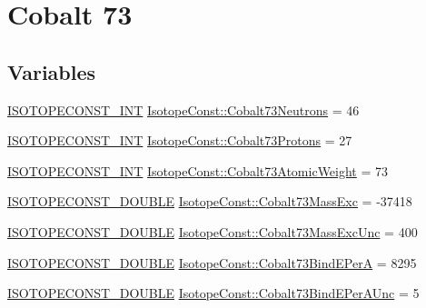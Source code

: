 \hypertarget{group___isotope_const-_cobalt-_co73}{}\section{Cobalt 73}
\label{group___isotope_const-_cobalt-_co73}
\subsection*{Variables}
\begin{DoxyCompactItemize}
\item 
\mbox{\hyperlink{group___isotope_const-_macros_ga5f18360b3e99483a35c32d789e62621c}{I\+S\+O\+T\+O\+P\+E\+C\+O\+N\+S\+T\+\_\+\+I\+NT}} \mbox{\hyperlink{group___isotope_const-_cobalt-_co73_ga8a43df0ca1a7d293366f0579ec31b93d}{Isotope\+Const\+::\+Cobalt73\+Neutrons}} = 46
\item 
\mbox{\hyperlink{group___isotope_const-_macros_ga5f18360b3e99483a35c32d789e62621c}{I\+S\+O\+T\+O\+P\+E\+C\+O\+N\+S\+T\+\_\+\+I\+NT}} \mbox{\hyperlink{group___isotope_const-_cobalt-_co73_ga216e86990e7608852b2e5d41c86776b8}{Isotope\+Const\+::\+Cobalt73\+Protons}} = 27
\item 
\mbox{\hyperlink{group___isotope_const-_macros_ga5f18360b3e99483a35c32d789e62621c}{I\+S\+O\+T\+O\+P\+E\+C\+O\+N\+S\+T\+\_\+\+I\+NT}} \mbox{\hyperlink{group___isotope_const-_cobalt-_co73_gaa41654b8da5d4ed40f9ed4557557b933}{Isotope\+Const\+::\+Cobalt73\+Atomic\+Weight}} = 73
\item 
\mbox{\hyperlink{group___isotope_const-_macros_ga8f45a7272ce02c0b4c65c44636ed719a}{I\+S\+O\+T\+O\+P\+E\+C\+O\+N\+S\+T\+\_\+\+D\+O\+U\+B\+LE}} \mbox{\hyperlink{group___isotope_const-_cobalt-_co73_ga4d8d3cf581ecbb00f1ea8498249d3997}{Isotope\+Const\+::\+Cobalt73\+Mass\+Exc}} = -\/37418
\item 
\mbox{\hyperlink{group___isotope_const-_macros_ga8f45a7272ce02c0b4c65c44636ed719a}{I\+S\+O\+T\+O\+P\+E\+C\+O\+N\+S\+T\+\_\+\+D\+O\+U\+B\+LE}} \mbox{\hyperlink{group___isotope_const-_cobalt-_co73_ga3ae03ea9bcb90185e91e19873a6ec0b6}{Isotope\+Const\+::\+Cobalt73\+Mass\+Exc\+Unc}} = 400
\item 
\mbox{\hyperlink{group___isotope_const-_macros_ga8f45a7272ce02c0b4c65c44636ed719a}{I\+S\+O\+T\+O\+P\+E\+C\+O\+N\+S\+T\+\_\+\+D\+O\+U\+B\+LE}} \mbox{\hyperlink{group___isotope_const-_cobalt-_co73_gacea6125d263a2a5dc3e2a5239881bcb2}{Isotope\+Const\+::\+Cobalt73\+Bind\+E\+PerA}} = 8295
\item 
\mbox{\hyperlink{group___isotope_const-_macros_ga8f45a7272ce02c0b4c65c44636ed719a}{I\+S\+O\+T\+O\+P\+E\+C\+O\+N\+S\+T\+\_\+\+D\+O\+U\+B\+LE}} \mbox{\hyperlink{group___isotope_const-_cobalt-_co73_gaa92b8e5296dc068e28bf2bb32111f3e5}{Isotope\+Const\+::\+Cobalt73\+Bind\+E\+Per\+A\+Unc}} = 5

\end{DoxyCompactItemize}
